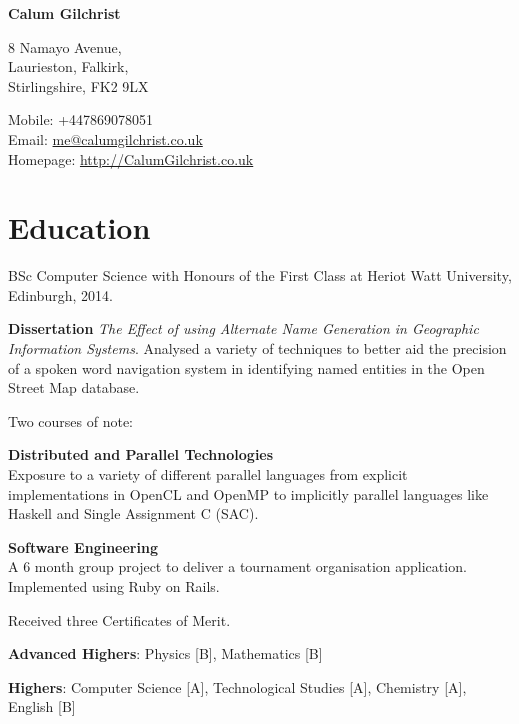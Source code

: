 \documentclass[11pt,a4paper]{article}
\def\name{Calum Gilchrist}
\renewenvironment{itemize}{
  \begin{list}{}{
    \setlength{\leftmargin}{1em}
    \setlength{\itemsep}{0.25em}
    \setlength{\parskip}{0pt}
    \setlength{\parsep}{0.25em}
    \renewcommand{\labelitemi}{$\bullet$}
  }
}{
  \end{list}
}
\begin{document}
%

\setlength{\parskip}{0em}


\centerline{\huge \bf \name}

\bigskip

\begin{minipage}[t]{0.495\textwidth}
  8 Namayo Avenue, \\
  Laurieston, Falkirk, \\
  Stirlingshire, FK2 9LX
\end{minipage}
\begin{minipage}[t]{0.495\textwidth}
  Mobile: +447869078051 \\
  Email: \href{mailto:me@calumgilchrist.co.uk}{me@calumgilchrist.co.uk} \\
  Homepage: \href{http://calumgilchrist.co.uk/}{http://CalumGilchrist.co.uk}
\end{minipage}

\section*{Education}

\begin{itemize}
    \item BSc Computer Science with Honours of the First Class at Heriot Watt University, Edinburgh, 2014.

    \begin{itemize}
        \item \textbf{Dissertation} \emph{The Effect of using Alternate Name Generation in Geographic Information Systems}. Analysed a variety of techniques to better aid the precision of a spoken word navigation system in identifying named entities in the Open Street Map database.
        \item Two courses of note:
            \begin{itemize}
                \item \textbf{Distributed and Parallel Technologies} \\
                    Exposure to a variety of different parallel languages from explicit implementations in OpenCL and OpenMP to implicitly parallel languages like Haskell and Single Assignment C (SAC).
                \item \textbf{Software Engineering} \\
                    A 6 month group project to deliver a tournament organisation application. Implemented using Ruby on Rails.
            \end{itemize}
        \item Received three Certificates of Merit. 
    \end{itemize}

    \item \textbf{Advanced Highers}: Physics [B], Mathematics [B]
    \item \textbf{Highers}: Computer Science [A], Technological Studies [A], Chemistry [A], English [B]
\end{itemize}
\end{document}
